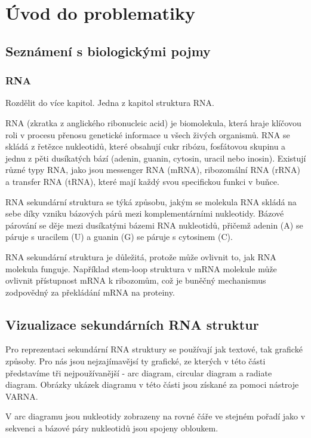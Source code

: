 
\chapter{Úvod do problematiky}

\section {Seznámení s biologickými pojmy}

\subsection{RNA} 

{\color{red}Rozdělit do více kapitol. Jedna z kapitol struktura RNA.}

RNA (zkratka z anglického ribonucleic acid) je biomolekula, která hraje
klíčovou roli v procesu přenosu genetické informace u všech živých organismů.
RNA se skládá z řetězce nukleotidů, které obsahují cukr ribózu, fosfátovou
skupinu a jednu z pěti dusíkatých bází (adenin, guanin, cytosin, uracil nebo
inosin). Existují různé typy RNA, jako jsou messenger RNA (mRNA), ribozomální
RNA (rRNA) a transfer RNA (tRNA), které mají každý svou specifickou funkci v
buňce.

RNA sekundární struktura se týká způsobu, jakým se molekula RNA skládá na sebe
díky vzniku bázových párů mezi komplementárními nukleotidy. Bázové párování se
děje mezi dusíkatými bázemi RNA nukleotidů, přičemž adenin (A) se páruje s
uracilem (U) a guanin (G) se páruje s cytosinem (C).

RNA sekundární struktura je důležitá, protože může ovlivnit to, jak RNA
molekula funguje. Například stem-loop struktura v mRNA molekule může ovlivnit
přístupnost mRNA k ribozomům, což je buněčný mechanismus zodpovědný za
překládání mRNA na proteiny.

\section{Vizualizace sekundárních RNA struktur} 

Pro reprezentaci sekundární RNA struktury se používají jak textové, tak
grafické způsoby. Pro nás jsou nejzajímavějsí ty grafické, ze kterých v této
části představíme tři nejpoužívanější - arc diagram, circular diagram a
radiate diagram. Obrázky ukázek diagramu v této části jsou získané za pomoci nástroje
VARNA\cite{Varna}.

V arc diagramu jsou nukleotidy zobrazeny na rovné čáře ve stejném pořadí jako v
sekvenci a bázové páry nukleotidů jsou spojeny obloukem.

